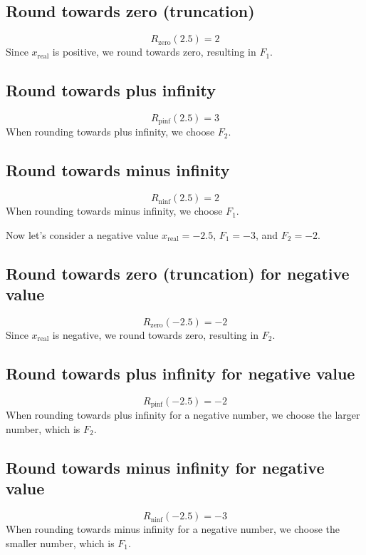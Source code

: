 \documentclass[12pt,openany]{book}
\begin{document}
			      	\subsection*{Round towards zero (truncation)}
			      	\[ R_{\text{zero}}(2.5) = 2 \]
			      	Since \( x_{\text{real}} \) is positive, we round towards zero, resulting in \( F_1 \).
			      	
			      	\subsection*{Round towards plus infinity}
			      	\[ R_{\text{pinf}}(2.5) = 3 \]
			      	When rounding towards plus infinity, we choose \( F_2 \).
			      	
			      	\subsection*{Round towards minus infinity}
			      	\[ R_{\text{ninf}}(2.5) = 2 \]
			      	When rounding towards minus infinity, we choose \( F_1 \).
			      	
			      	Now let's consider a negative value \( x_{\text{real}} = -2.5 \), \( F_1 = -3 \), and \( F_2 = -2 \).
			      	
			      	\subsection*{Round towards zero (truncation) for negative value}
			      	\[ R_{\text{zero}}(-2.5) = -2 \]
			      	Since \( x_{\text{real}} \) is negative, we round towards zero, resulting in \( F_2 \).
			      	
			      	\subsection*{Round towards plus infinity for negative value}
			      	\[ R_{\text{pinf}}(-2.5) = -2 \]
			      	When rounding towards plus infinity for a negative number, we choose the larger number, which is \( F_2 \).
			      	
			      	\subsection*{Round towards minus infinity for negative value}
			      	\[ R_{\text{ninf}}(-2.5) = -3 \]
			      	When rounding towards minus infinity for a negative number, we choose the smaller number, which is \( F_1 \).
			      	
\end{document}
